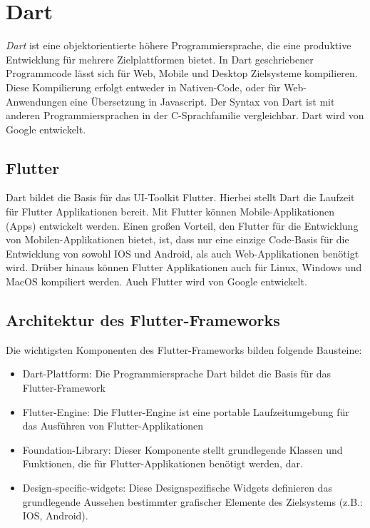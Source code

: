 \section{Dart}
\label{dart}

\textit{Dart} ist eine objektorientierte höhere Programmiersprache, die eine produktive Entwicklung für
mehrere Zielplattformen bietet. In Dart geschriebener Programmcode lässt sich für Web, Mobile und 
Desktop Zielsysteme kompilieren. 
Diese Kompilierung erfolgt entweder in Nativen-Code, oder für Web-Anwendungen eine Übersetzung in Javascript.
Der Syntax von Dart ist mit anderen Programmiersprachen in der C-Sprachfamilie vergleichbar.
Dart wird von Google entwickelt.
\cite{dartwikipedia}

\subsection{Flutter}
Dart bildet die Basis für das UI-Toolkit Flutter. Hierbei stellt Dart die Laufzeit für Flutter Applikationen bereit.
Mit Flutter können Mobile-Applikationen (Apps) entwickelt werden. 
Einen großen Vorteil, den Flutter für die Entwicklung von Mobilen-Applikationen bietet, ist, 
dass nur eine einzige Code-Basis für die Entwicklung von sowohl IOS und Android, als auch Web-Applikationen benötigt wird.
Drüber hinaus können Flutter Applikationen auch für Linux, Windows und MacOS kompiliert werden. 
Auch Flutter wird von Google entwickelt.
\cite{flutterwikipediaEN}

\subsection{Architektur des Flutter-Frameworks}
Die wichtigsten Komponenten des Flutter-Frameworks bilden folgende Bausteine: \cite{flutterwikipediaEN}
\begin{itemize}
    \item Dart-Plattform: Die Programmiersprache Dart bildet die Basis für das Flutter-Framework
    \item Flutter-Engine: Die Flutter-Engine ist eine portable Laufzeitumgebung für das Ausführen von Flutter-Applikationen
    \item Foundation-Library: Dieser Komponente stellt grundlegende Klassen und Funktionen, die für 
    Flutter-Applikationen benötigt werden, dar.
    \item Design-specific-widgets: Diese Designspezifische Widgets definieren das grundlegende Aussehen
    bestimmter grafischer Elemente des Zielsystems (z.B.: IOS, Android).
\end{itemize}


